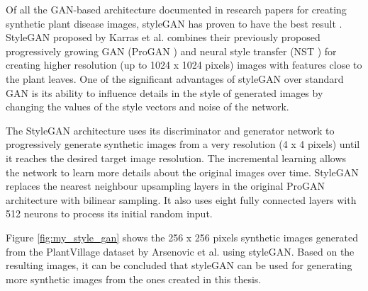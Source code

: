 
Of all the GAN-based architecture documented in research papers for creating synthetic plant disease images, styleGAN has proven to have the best result \cite{arsenovic2019solving}. StyleGAN proposed by Karras et al. \cite{karras2019style} combines their previously proposed progressively growing GAN (ProGAN \cite{karras2017progressive}) and neural style transfer (NST \cite{gatys2015neural}) for creating higher resolution (up to 1024 x 1024 pixels) images with features close to the plant leaves. One of the significant advantages of styleGAN over standard GAN is its ability to influence details in the style of generated images by changing the values of the style vectors and noise of the network.


The StyleGAN architecture uses its discriminator and generator network to progressively generate synthetic images from a very resolution (4 x 4 pixels) until it reaches the desired target image resolution. The incremental learning allows the network to learn more details about the original images over time. StyleGAN replaces the nearest neighbour upsampling layers in the original ProGAN architecture with bilinear sampling. It also uses eight fully connected layers with 512 neurons to process its initial random input.

Figure \ref{fig:my_style_gan} shows the 256 x 256 pixels synthetic images generated from the PlantVillage dataset by Arsenovic et al. \cite{arsenovic2019solving} using styleGAN. Based on the resulting images, it can be concluded that styleGAN can be used for generating more synthetic images from the ones created in this thesis.

